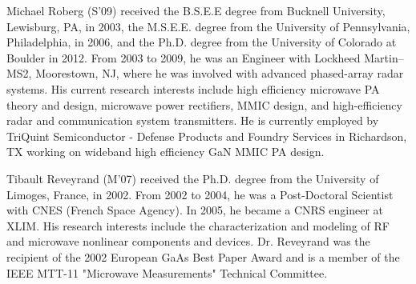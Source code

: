 \begin{IEEEbiography}{Michael Roberg}
(S'09) received the B.S.E.E degree from Bucknell University, Lewisburg, PA, in 2003, the M.S.E.E. degree from the University of Pennsylvania, Philadelphia, in 2006, and the Ph.D. degree from the University of Colorado at Boulder in 2012. From 2003 to 2009, he was an Engineer with Lockheed Martin–MS2, Moorestown, NJ, where he was involved with advanced phased-array radar systems. His current research interests include high efficiency microwave PA theory and design, microwave power rectifiers, MMIC design, and high-efficiency radar and communication system transmitters. He is currently employed by TriQuint Semiconductor - Defense Products and Foundry Services in Richardson, TX working on wideband high efficiency GaN MMIC PA design.
\end{IEEEbiography}
\begin{IEEEbiography}{Tibault Reveyrand}
(M'07)  received the Ph.D. degree from the University of Limoges, France, in 2002.
From 2002 to 2004, he was a Post-Doctoral Scientist with CNES (French Space Agency). In 2005, he became a CNRS engineer at XLIM. His research interests include the characterization and modeling of RF and microwave nonlinear components and devices.
Dr. Reveyrand was the recipient of the 2002 European GaAs Best Paper Award and is a member of the IEEE MTT-11 "Microwave Measurements" Technical Committee.
\end{IEEEbiography}
